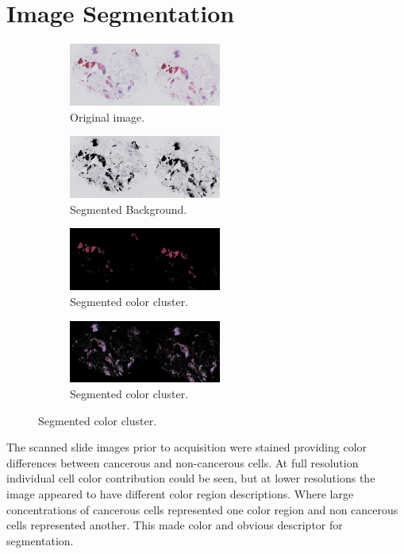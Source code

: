 \documentclass[a4paper,10pt,oneside]{article}
\begin{document}

\section{Image Segmentation}
\begin{figure}[hbpt]
  \centering
  \begin{subfigure}{5cm}
    \includegraphics[width=5cm]{images/PO13-00516A1_1_7_201305171148_half.png}
    \caption{Original image.}
  \end{subfigure}
  \begin{subfigure}{5cm}
    \includegraphics[width=5cm]{images/PO13-00516A1_1_7_201305171148_cluster_1.png}
    \caption{Segmented Background.}
  \end{subfigure}
  \begin{subfigure}{5cm}
    \includegraphics[width=5cm]{images/PO13-00516A1_1_7_201305171148_cluster_2.png}
    \caption{Segmented color cluster.}
  \end{subfigure}
  \begin{subfigure}{5cm}
    \includegraphics[width=5cm]{images/PO13-00516A1_1_7_201305171148_cluster_3.png}
    \caption{Segmented color cluster.}
  \end{subfigure}
\end{figure}
The scanned slide images prior to acquisition were stained providing color differences between cancerous and non-cancerous cells. At full resolution individual cell color contribution could be seen, but at lower resolutions the image appeared to have different color region descriptions. Where large concentrations of cancerous cells represented one color region and non cancerous cells represented another. This made color and obvious descriptor for segmentation.
\end{document}
